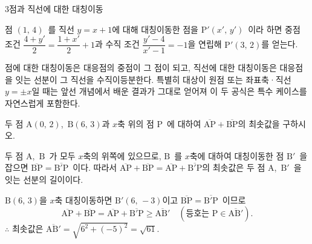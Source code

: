 \documentclass[10pt]{article}
\begin{document}
\begin{dmconcept}{3}{점과 직선에 대한 대칭이동}
\begin{dmexample}
점 $(1,\, 4)$\ 를 직선 $y = x + 1$에 대해 대칭이동한 점을 $\mathrm{P}'(x',\, y')$\ 이라 하면 중점 조건 $\dfrac{4 + y'}{2} = \dfrac{1 + x'}{2} + 1$과 수직 조건 $\dfrac{y' - 4}{x' - 1} = -1$을 연립해 $\mathrm{P}'(3,\, 2)$를 얻는다.
\end{dmexample}

\begin{dmnote}
점에 대한 대칭이동은 대응점의 중점이 그 점이 되고, 직선에 대한 대칭이동은 대응점을 잇는 선분이 그 직선을 수직이등분한다. 특별히 대상이 원점 또는 좌표축·직선 $y = \pm x$일 때는 앞선 개념에서 배운 결과가 그대로 얻어져 이 두 공식은 특수 케이스를 자연스럽게 포함한다.
\end{dmnote}

\end{dmconcept}

\newpage


\begin{dmproblem}
두 점 $\mathrm{A}(0,\, 2)$,\ $\mathrm{B}(6,\, 3)$과 $x$축 위의 점 $\mathrm{P}$\ 에 대하여 $\overline{\mathrm{AP}} + \overline{\mathrm{BP}}$의 최솟값을 구하시오.
\end{dmproblem}

\begin{dmapproach}
두 점 $\mathrm{A}$,\ $\mathrm{B}$\ 가 모두 $x$축의 위쪽에 있으므로, $\mathrm{B}$\ 를 $x$축에 대하여 대칭이동한 점 $\mathrm{B}'$\ 을 잡으면 $\overline{\mathrm{BP}} = \overline{\mathrm{B}'\mathrm{P}}$\ 이다. 따라서 $\overline{\mathrm{AP}} + \overline{\mathrm{BP}} = \overline{\mathrm{AP}} + \overline{\mathrm{B}'\mathrm{P}}$의 최솟값은 두 점 $\mathrm{A}$,\ $\mathrm{B}'$\ 을 잇는 선분의 길이이다.
\end{dmapproach}

\begin{dmsolution}
$\mathrm{B}(6,\, 3)$을 $x$축 대칭이동하면 $\mathrm{B}'(6,\, -3)$이고 $\overline{\mathrm{BP}} = \overline{\mathrm{B}'\mathrm{P}}$\ 이므로
\begin{equation*}
  \overline{\mathrm{AP}} + \overline{\mathrm{BP}} = \overline{\mathrm{AP}} + \overline{\mathrm{B}'\mathrm{P}} \ge \overline{\mathrm{AB}'}\quad(\text{등호는 } \mathrm{P} \in \overline{\mathrm{AB}'}).
\end{equation*}
$\therefore$ 최솟값은 $\overline{\mathrm{AB}'} = \sqrt{6^2 + (-5)^2} = \sqrt{61}$.
\end{dmsolution}
\end{document}
